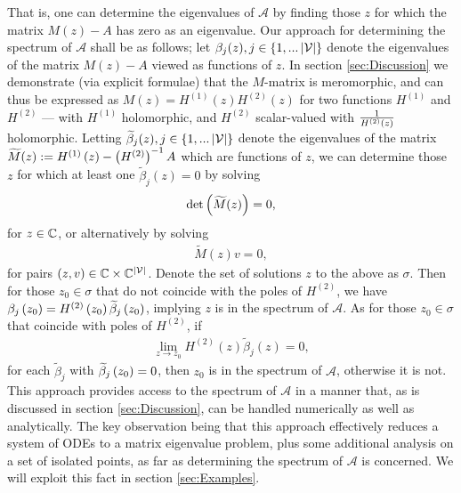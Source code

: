 That is, one can determine the eigenvalues of $\mathcal{A}$ by finding those $z$ for which the matrix $M(z)-A$ has zero as an eigenvalue.
Our approach for determining the spectrum of $\mathcal{A}$ shall be as follows; let $\beta_j(z), j\in\left\{ 1,...\left\lvert \mathcal{V} \right\rvert \right\}$ denote the eigenvalues of the matrix $M(z)-A$ viewed as  functions of $z$.
In section \ref{sec:Discussion} we demonstrate (via explicit formulae) that the $M$-matrix is meromorphic, and can thus be expressed as $M(z) = H^{(1)}(z)H^{(2)}(z)$ for two functions $H^{(1)}$ and $H^{(2)}$ --- with $H^{(1)}$ holomorphic, and $H^{(2)}$ scalar-valued with $\frac{1}{H^{(2)}(z)}$ holomorphic.
Letting $\widetilde{\beta}_j(z), j\in\left\{ 1,...\left\lvert \mathcal{V} \right\rvert \right\}$ denote the eigenvalues of the matrix $\widetilde{M}(z) := H^{(1)}\left( z \right) - \left( H^{(2)} \right)^{-1}A$ which are  functions of $z$, we can determine those $z$ for which at least one $\widetilde{\beta}_j(z)=0$ by solving
\begin{align*}
	\mathrm{det}\left( \widetilde{M}(z) \right) = 0,
\end{align*}
for $z\in\mathbb{C}$, or alternatively by solving
\begin{align*}
	\widetilde{M}(z)v = 0,
\end{align*}
for pairs $\left( z,v \right)\in\mathbb{C}\times\mathbb{C}^{\left\lvert \mathcal{V} \right\rvert}$.
Denote the set of solutions $z$ to the above as $\sigma$.
Then for those $z_0\in\sigma$ that do not coincide with the poles of $H^{(2)}$, we have $\beta_{j}\left( z_0 \right) = H^{(2)}\left( z_0 \right)\widetilde{\beta}_j\left( z_0 \right)$, implying $z$ is in the spectrum of $\mathcal{A}$.
As for those $z_0\in\sigma$ that coincide with poles of $H^{(2)}$, if
\begin{align*}
	\lim_{z\rightarrow z_0}H^{(2)}(z)\widetilde{\beta}_j(z) = 0,
\end{align*} 
for each $\widetilde{\beta}_j$ with $\widetilde{\beta}_j\left( z_0 \right)=0$, then $z_0$ is in the spectrum of $\mathcal{A}$, otherwise it is not.
This approach provides access to the spectrum of $\mathcal{A}$ in a manner that, as is discussed in section \ref{sec:Discussion}, can be handled numerically as well as analytically.
The key observation being that this approach effectively reduces a system of ODEs to a matrix eigenvalue problem, plus some additional analysis on a set of isolated points, as far as determining the spectrum of $\mathcal{A}$ is concerned.
We will exploit this fact in section \ref{sec:Examples}.

